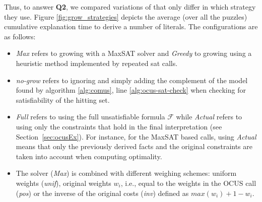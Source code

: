 Thus, to answer \textbf{Q2}, we compared variations of  \comus that only differ in which \grow strategy they use. 
Figure \ref{fig:grow_strategies} depicts the average (over all the puzzles) cumulative explanation time to derive a number of literals.
The configurations are as follows:
\begin{itemize}
\item \emph{Max} refers to growing with a MaxSAT solver and \emph{Greedy} to growing using a heuristic method implemented by repeated sat calls. 
\item \emph{no-grow} refers to ignoring \grow and simply adding the complement of the model found by algorithm \ref{alg:comus}, line \ref{alg:ocus-sat-check} when checking for satisfiability of the hitting set.
\item  \emph{Full} refers to using the full unsatisfiable formula $\mathcal{F}$  while \emph{Actual} refers to using only the constraints that hold in the final interpretation (see Section~\ref{sec:ocusEx}). For instance, for the MaxSAT based calls, using \emph{Actual} means that only the previously derived facts and the original constraints are taken into account when computing optimality. 
\item The \maxsat solver (\emph{Max}) is combined with different weighing schemes: uniform weights (\emph{unif}), original weights $w_i$, i.e., equal to the weights in the OCUS call (\emph{pos}) or the inverse of the original costs (\emph{inv}) defined as $max(w_i) + 1 - w_i$.%
\end{itemize}


